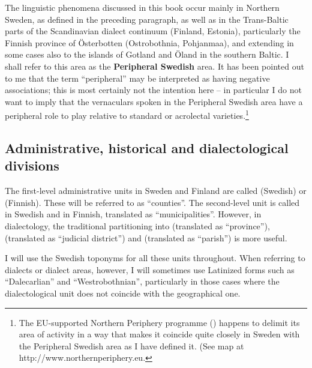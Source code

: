 The linguistic phenomena discussed in this book occur mainly in Northern Sweden, as defined in the preceding paragraph, as well as in the Trans-Baltic parts of the Scandinavian dialect continuum (Finland, Estonia), particularly the Finnish province of Österbotten (Ostrobothnia, Pohjanmaa), and extending in some cases also to the islands of Gotland and Öland in the southern Baltic. I shall refer to this area as the \textbf{Peripheral Swedish }area. It has been pointed out to me that the term “peripheral” may be interpreted as having negative associations; this is most certainly not the intention here – in particular I do not want to imply that the vernaculars spoken in the Peripheral Swedish area have a peripheral role to play relative to standard or acrolectal varieties.\footnote{ The EU-supported Northern Periphery programme () happens to delimit its area of activity in a way that makes it coincide quite closely in Sweden with the Peripheral Swedish area as I have defined it. (See map at http://www.northernperiphery.eu.} 

\subsection[Administrative, historical and dialectological divisions]{\rmfamily Administrative, historical and dialectological divisions}
The first-level administrative units in Sweden and Finland are called  (Swedish) or  (Finnish). These will be referred to as “counties”. The second-level unit is called  in Swedish and  in Finnish, translated as “municipalities”. However, in dialectology, the traditional partitioning into  (translated as “province”),  (translated as “judicial district”) and  (translated as “parish”) is more useful. 

I will use the Swedish toponyms for all these units throughout. When referring to dialects or dialect areas, however, I will sometimes use Latinized forms such as “Dalecarlian” and “Westrobothnian”, particularly in those cases where the dialectological unit does not coincide with the geographical one.

